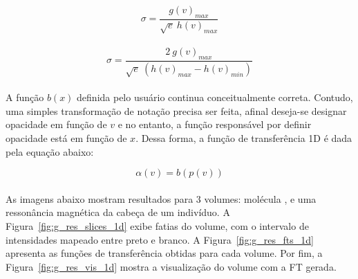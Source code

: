\begin{equation} \label{eq:sigmav}
	\sigma = \frac{g(v)_{max}}{\sqrt{e}\ h(v)_{max}}
\end{equation} \\

\begin{equation} \label{eq:sigmav2}
	\sigma = \frac{2\ g(v)_{max}}{\sqrt{e}\ (h(v)_{max} - h(v)_{min})}
\end{equation} \\

	A função $b(x)$ definida pelo usuário continua conceitualmente correta. Contudo, uma simples transformação de notação precisa ser feita, afinal deseja-se designar opacidade em função de $v$ e no entanto, a função responsável por definir opacidade está em função de $x$. Dessa forma, a função de transferência 1D é dada pela equação abaixo:
	
\begin{equation} \label{eq:alpha}
	\alpha(v) = b(p(v))
\end{equation} \\

	As imagens abaixo mostram resultados para 3 volumes: molécula ,  e uma ressonância magnética da cabeça de um indivíduo. A Figura~\ref{fig:g_res_slices_1d} exibe fatias do volume, com o intervalo de intensidades mapeado entre preto e branco. A Figura~\ref{fig:g_res_fts_1d} apresenta as funções de transferência obtidas para cada volume. Por fim, a Figura~\ref{fig:g_res_vis_1d} mostra a visualização do volume com a FT gerada.

	
%
%
    
